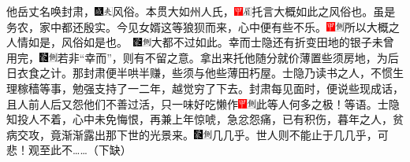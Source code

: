他岳丈名唤封肃，{\includegraphics[width=3mm]{../Images/00005}\includegraphics[width=3mm]{../Images/00012}\footnotesize \kaishu 风俗。}本贯大如州人氏，{\includegraphics[width=3mm]{../Images/00002}\includegraphics[width=3mm]{../Images/00010}\footnotesize \kaishu 托言大概如此之风俗也。}虽是务农，家中都还殷实。今见女婿这等狼狈而来，心中便有些不乐。{{\includegraphics[width=3mm]{../Images/00002}\includegraphics[width=3mm]{../Images/00011}\footnotesize \kaishu 所以大概之人情如是，风俗如是也。　}\includegraphics[width=3mm]{../Images/00006}\includegraphics[width=3mm]{../Images/00011}\footnotesize \kaishu 大都不过如此。}幸而士隐还有折变田地的银子未曾用完，{\includegraphics[width=3mm]{../Images/00006}\includegraphics[width=3mm]{../Images/00011}\footnotesize \kaishu 若非``幸而''，则有不留之意。}拿出来托他随分就价薄置些须房地，为后日衣食之计。那封肃便半哄半赚，些须与他些薄田朽屋。士隐乃读书之人，不惯生理稼穑等事，勉强支持了一二年，越觉穷了下去。封肃每见面时，便说些现成话，且人前人后又怨他们不善过活，只一味好吃懒作{\includegraphics[width=3mm]{../Images/00002}\includegraphics[width=3mm]{../Images/00011}\footnotesize \kaishu 此等人何多之极！}等语。士隐知投人不着，心中未免悔恨，再兼上年惊唬，急忿怨痛，已有积伤，暮年之人，贫病交攻，竟渐渐露出那下世的光景来。{{\includegraphics[width=3mm]{../Images/00006}\includegraphics[width=3mm]{../Images/00011}\footnotesize \kaishu 几几乎。世人则不能止于几几乎，可悲！观至此不\ldots{}\ldots{}}（下缺）}


